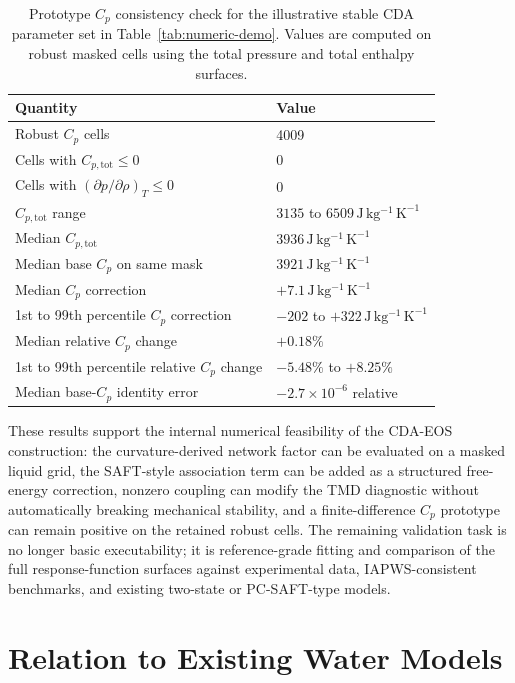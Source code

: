 \documentclass[12pt]{article}
\begin{document}
\begin{table}[htbp]
\centering
\caption{Prototype $C_p$ consistency check for the illustrative stable CDA parameter set in Table~\ref{tab:numeric-demo}. Values are computed on robust masked cells using the total pressure and total enthalpy surfaces.}
\label{tab:cp-demo}
\begin{tabular}{@{}ll@{}}
\toprule
Quantity & Value \\
\midrule
Robust $C_p$ cells & 4009 \\
Cells with $C_{p,\mathrm{tot}}\le 0$ & 0 \\
Cells with $(\partial p/\partial\rho)_T\le 0$ & 0 \\
$C_{p,\mathrm{tot}}$ range & $3135$ to $6509\,\mathrm{J\,kg^{-1}\,K^{-1}}$ \\
Median $C_{p,\mathrm{tot}}$ & $3936\,\mathrm{J\,kg^{-1}\,K^{-1}}$ \\
Median base $C_p$ on same mask & $3921\,\mathrm{J\,kg^{-1}\,K^{-1}}$ \\
Median $C_p$ correction & $+7.1\,\mathrm{J\,kg^{-1}\,K^{-1}}$ \\
1st to 99th percentile $C_p$ correction & $-202$ to $+322\,\mathrm{J\,kg^{-1}\,K^{-1}}$ \\
Median relative $C_p$ change & $+0.18\%$ \\
1st to 99th percentile relative $C_p$ change & $-5.48\%$ to $+8.25\%$ \\
Median base-$C_p$ identity error & $-2.7\times10^{-6}$ relative \\
\bottomrule
\end{tabular}
\end{table}

These results support the internal numerical feasibility of the CDA-EOS construction: the curvature-derived network factor can be evaluated on a masked liquid grid, the SAFT-style association term can be added as a structured free-energy correction, nonzero coupling can modify the TMD diagnostic without automatically breaking mechanical stability, and a finite-difference $C_p$ prototype can remain positive on the retained robust cells. The remaining validation task is no longer basic executability; it is reference-grade fitting and comparison of the full response-function surfaces against experimental data, IAPWS-consistent benchmarks, and existing two-state or PC-SAFT-type models.

\section{Relation to Existing Water Models}
\end{document}
